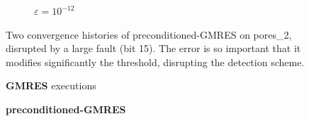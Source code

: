 \documentclass[twoside]{article}
\newcounter{fig}\setcounter{fig}{0}
\begin{document}
\begin{figure}[H]
\begin{minipage}[b]{0.48\linewidth}
\begin{subfigure}[t]{\linewidth}
        \caption{$\varepsilon = 10^{-12}$}\label{fig:pores_2_test_result_1}	
      \end{subfigure}

    \end{minipage}
    \caption{Two convergence histories of preconditioned-GMRES on pores_2, disrupted by a large fault (bit 15). The error is so important that it modifies significantly the threshold, disrupting the detection scheme.}\label{fig:test_result}
  \end{figure}\label{fig:why}






  \begin{figure}[H]
    \centering
    
    \begin{minipage}[b]{0.45\linewidth}
      \centering
      \textbf{GMRES} executions
    \end{minipage}
    \quad
    \begin{minipage}{0.45\linewidth}
      \centering
      \textbf{preconditioned-GMRES}
    \end{minipage}\\


    \begin{minipage}[b]{0.48\linewidth}
      

\end{minipage}
\end{figure}
\end{document}
